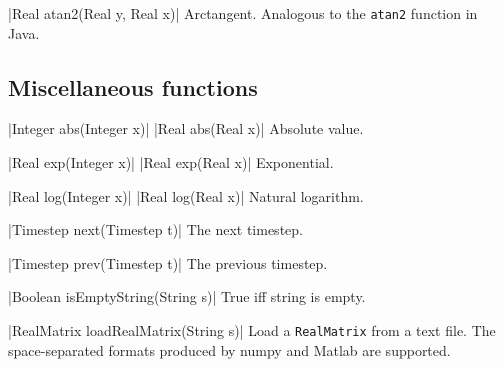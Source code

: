 \blog|Real atan2(Real y, Real x)|
\myindent Arctangent. Analogous to the \verb|atan2| function in Java.


\subsection{Miscellaneous functions}
\label{sec:builtin-misc}

\blog|Integer abs(Integer x)|
\blog|Real abs(Real x)|
\myindent Absolute value.

\blog|Real exp(Integer x)|
\blog|Real exp(Real x)|
\myindent Exponential.

\blog|Real log(Integer x)|
\blog|Real log(Real x)|
\myindent Natural logarithm.

\blog|Timestep next(Timestep t)|
\myindent The next timestep.

\blog|Timestep prev(Timestep t)|
\myindent The previous timestep.

\blog|Boolean isEmptyString(String s)|
\myindent True iff string is empty.

\blog|RealMatrix loadRealMatrix(String s)|
\myindent Load a \verb|RealMatrix| from a text file. The space-separated
formats produced by numpy and Matlab are supported.

